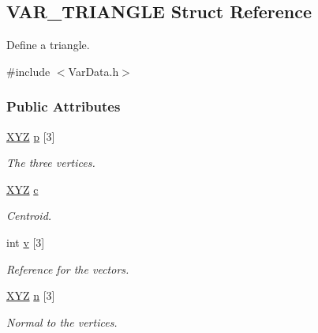 \hypertarget{structVAR__TRIANGLE}{\subsection{\-V\-A\-R\-\_\-\-T\-R\-I\-A\-N\-G\-L\-E \-Struct \-Reference}
\label{structVAR__TRIANGLE}
}


\-Define a triangle.  




{\ttfamily \#include $<$\-Var\-Data.\-h$>$}

\subsubsection*{\-Public \-Attributes}
\begin{DoxyCompactItemize}
\item 
\hypertarget{structVAR__TRIANGLE_abb19475a6b83f96d1f41b2a120910022}{\hyperlink{structXYZ}{\-X\-Y\-Z} \hyperlink{structVAR__TRIANGLE_abb19475a6b83f96d1f41b2a120910022}{p} \mbox{[}3\mbox{]}}\label{structVAR__TRIANGLE_abb19475a6b83f96d1f41b2a120910022}

\begin{DoxyCompactList}\small\item\em \-The three vertices. \end{DoxyCompactList}\item 
\hypertarget{structVAR__TRIANGLE_ae93aa7b3bc74295f6f1118a6b0a0e804}{\hyperlink{structXYZ}{\-X\-Y\-Z} \hyperlink{structVAR__TRIANGLE_ae93aa7b3bc74295f6f1118a6b0a0e804}{c}}\label{structVAR__TRIANGLE_ae93aa7b3bc74295f6f1118a6b0a0e804}

\begin{DoxyCompactList}\small\item\em \-Centroid. \end{DoxyCompactList}\item 
\hypertarget{structVAR__TRIANGLE_adf75f0e81beb91b0ef5de318ab595455}{int \hyperlink{structVAR__TRIANGLE_adf75f0e81beb91b0ef5de318ab595455}{v} \mbox{[}3\mbox{]}}\label{structVAR__TRIANGLE_adf75f0e81beb91b0ef5de318ab595455}

\begin{DoxyCompactList}\small\item\em \-Reference for the vectors. \end{DoxyCompactList}\item 
\hypertarget{structVAR__TRIANGLE_a1db8f1be3299f0c5f218cf0142c6c687}{\hyperlink{structXYZ}{\-X\-Y\-Z} \hyperlink{structVAR__TRIANGLE_a1db8f1be3299f0c5f218cf0142c6c687}{n} \mbox{[}3\mbox{]}}\label{structVAR__TRIANGLE_a1db8f1be3299f0c5f218cf0142c6c687}

\begin{DoxyCompactList}\small\item\em \-Normal to the vertices. \end{DoxyCompactList}\end{DoxyCompactItemize}


